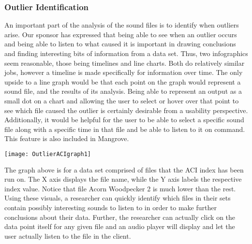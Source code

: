 \subsubsection{Outlier Identification}
An important part of the analysis of the sound files is to identify when outliers arise. Our sponsor has expressed that being able to see when an outlier occurs and being able to listen to what caused it is important in drawing conclusions and finding interesting bits of information from a data set. Thus, two infographics seem reasonable, those being timelines and line charts. Both do relatively similar jobs, however a timeline is made specifically for information over time. The only upside to a line graph would be that each point on the graph would represent a sound file, and the results of its analysis. Being able to represent an output as a small dot on a chart and allowing the user to select or hover over that point to see which file caused the outlier is certainly desirable from a usability perspective. Additionally, it would be helpful for the user to be able to select a specific sound file along with a specific time in that file and be able to listen to it on command. This feature is also included in Mangrove.\par
\begin{center}
  \texttt{[image: OutlierACIgraph1]} \\[12pt]
\end{center}
The graph above is for a data set comprised of files that the ACI index has been run on. The X axis displays the file name, while the Y axis labels the respective index value. Notice that file Acorn Woodpecker 2 is much lower than the rest. Using these visuals, a researcher can quickly identify which files in their sets contain possibly interesting sounds to listen to in order to make further conclusions about their data. Further, the researcher can actually click on the data point itself for any given file and an audio player will display and let the user actually listen to the file in the client.
